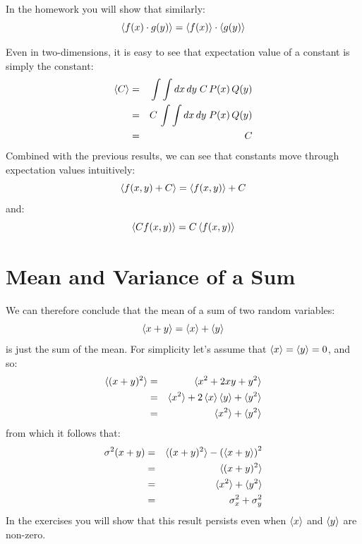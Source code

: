 \documentclass[12pt,oneside]{book}
\begin{document}
In the homework you will show that similarly:
\begin{equation}
\braket{f(x) \cdot g(y)} = \braket{f(x)} \cdot \braket{g(y)} \label{eqn:expprod}
\end{equation}

Even in two-dimensions, it is easy to see that expectation value of a
constant is simply the constant:
\begin{eqnarray*}
\braket{C} &=& \int \int dx \, dy \; C \, P(x) \, Q(y) \\
&=& C \, \int \int dx \, dy \; P(x) \, Q(y) \\
&=& C \\
\end{eqnarray*}
Combined with the previous results, we can see that constants move through expectation values intuitively:
\begin{equation}
  \braket{f(x,y) + C } = \braket{f(x,y)} + C  
\end{equation}
and:
\begin{equation}
  \braket{C f(x,y) } = C \braket{f(x,y)}  
\end{equation}

\section{Mean and Variance of a Sum}

We can therefore conclude that the mean of a sum of two random variables:
\begin{displaymath}
\braket{x + y} = \braket{x} + \braket{y} 
\end{displaymath}
is just the sum of the mean.  For simplicity let's assume that
$\braket{x} = \braket{y} = 0$, and so:
\begin{eqnarray*}
\braket{(x + y)^2} &=& \braket{x^2 + 2xy + y^2} \\
&=& \braket{x^2} + 2\braket{x}\braket{y} + \braket{y^2} \\
&=& \braket{x^2} + \braket{y^2} \\
\end{eqnarray*}
from which it follows that:
\begin{eqnarray*}
\sigma^2(x+y) &=& \braket{(x+y)^2} - \left( \braket{x+y} \right) ^2\\
&=& \braket{(x+y)^2}\\
&=& \braket{x^2} + \braket{y^2} \\
&=& \sigma^2_x + \sigma^2_y\\
\end{eqnarray*}
In the exercises you will show that this result persists even when $\braket{x}$ and
$\braket{y}$ are non-zero.
\end{document}
